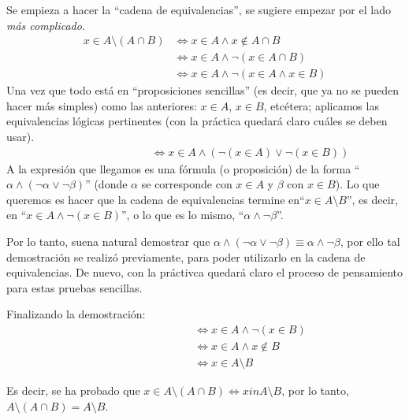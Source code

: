 \documentclass[letterpaper,DIV=12,headsepline,12pt]{scrartcl}
\makeatletter
\renewenvironment{proof}[1][]{%
        \par\pushQED{\qed}%
        \normalfont\topsep6pt \partopsep0pt %
        \trivlist
        \item[\hskip\labelsep
                \textbf{\textit{Demostración.}}%
        ]#1
        }{%
        \popQED\endtrivlist\@endpefalse
    }
\makeatother
\begin{document}
    \begin{proof}
        \textcolor{black!70}{Se empieza a hacer la ``cadena de equivalencias'', se sugiere empezar por el lado \textit{más complicado}.}
        \begin{align*}
            x \in A \setminus (A \cap B) & \Leftrightarrow x \in A \land x \notin A \cap B \tag*{Def. de \( \setminus \)} \\
            & \Leftrightarrow x \in A \land \lnot (x \in A \cap B) \tag*{Def. de \( \notin \)} \\
            & \Leftrightarrow x \in A \land \lnot(x \in A \land x \in B) \tag*{Def. de \( \cap \)}
        \end{align*}
        \textcolor{black!70}{Una vez que todo está en ``proposiciones sencillas'' (es decir, que ya no se pueden hacer más simples) como las anteriores: \(x \in A\), \(x \in B\), etcétera; aplicamos las equivalencias lógicas pertinentes (con la práctica quedará claro cuáles se deben usar).}
        \begin{align*}
            \phantom{x \in A \setminus (A \cap B)} & \Leftrightarrow x \in A \land (\lnot(x \in A) \lor \lnot(x \in B)) \tag*{Leyes de De Morgan}            
        \end{align*}
        \textcolor{black!70}{A la expresión que llegamos es una fórmula (o proposición) de la forma ``\(\alpha \land (\lnot \alpha \lor \lnot \beta) \)'' (donde \(\alpha\) se corresponde con \(x \in A\) y \(\beta\) con \(x \in B\)). Lo que queremos es hacer que la cadena de equivalencias termine en``\(x \in A \setminus B\)'', es decir, en ``\(x \in A \land \lnot(x \in B)\)'', o lo que es lo mismo, ``\(\alpha \land \lnot \beta\)''.}
        
        \textcolor{black!70}{Por lo tanto, suena natural demostrar que \(\alpha \land (\lnot \alpha \lor \lnot \beta) \equiv \alpha \land \lnot \beta\), por ello tal demostración se realizó previamente, para poder utilizarlo en la cadena de equivalencias. De nuevo, con la práctivca quedará claro el proceso de pensamiento para estas pruebas sencillas.}

        \textcolor{black!70}{Finalizando la demostración:}
        \begin{align*}
            \phantom{x \in A \setminus (A \cap B)} & \Leftrightarrow x \in A \land \lnot(x \in B) \tag*{\(\alpha \land (\lnot \alpha \lor \lnot \beta) \equiv \alpha \land \lnot \beta\)} \\
            & \Leftrightarrow x \in A \land x \notin B \tag*{Def. de \( \notin \)} \\
            & \Leftrightarrow x \in A \setminus B \tag*{Def. de \( \setminus \)}
        \end{align*}

        Es decir, se ha probado que \(x \in A \setminus (A \cap B) \Leftrightarrow x in A \setminus B\), por lo tanto, $A \setminus (A \cap B) = A \setminus B$.
    \end{proof}
\end{document}
